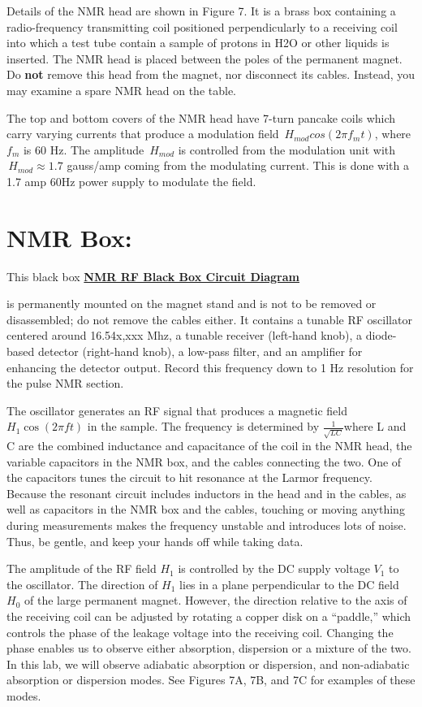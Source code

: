 \documentclass{../lab}
\begin{document}
Details of the NMR head are shown in Figure 7. It is a brass box containing a radio-frequency transmitting coil positioned perpendicularly to a receiving coil into which a test tube contain a sample of protons in H2O or other liquids is inserted. The NMR head is placed between the poles of the permanent magnet. Do \textbf{not} remove this head from the magnet, nor disconnect its cables. Instead, you may examine a spare NMR head on the table.

The top and bottom covers of the NMR head have 7-turn pancake coils which carry varying currents that produce a modulation field ${ \!\,H_{mod} cos \left (2 \pi f_m t \right) }$, where $ {f_m }$ is 60 Hz. The amplitude $ {\!\,H_{mod} }$ is controlled from the modulation unit with $ {\!\, H_{mod} \approx 1.7 }$ gauss/amp coming from the modulating current. This is done with a 1.7 amp 60Hz power supply to modulate the field.

\section{NMR Box:}

This black box \href{http://experimentationlab.berkeley.edu/sites/default/files/images/NMR31.gif}{\textbf{NMR RF Black Box Circuit Diagram}}

is permanently mounted on the magnet stand and is not to be removed or disassembled; do not remove the cables either. It contains a tunable RF oscillator centered around 16.54x,xxx Mhz, a tunable receiver (left-hand knob), a diode-based detector (right-hand knob), a low-pass filter, and an amplifier for enhancing the detector output. Record this frequency down to 1 Hz resolution for the pulse NMR section.

The oscillator generates an RF signal that produces a magnetic field  $ {H_1 \cos \left (2 \pi f t \right) }$ in the sample. The frequency is determined by ${ \frac {1} {\sqrt{LC}} }$where L and C are the combined inductance and capacitance of the coil in the NMR head, the variable capacitors in the NMR box, and the cables connecting the two. One of the capacitors tunes the circuit to hit resonance at the Larmor frequency. Because the resonant circuit includes inductors in the head and in the cables, as well as capacitors in the NMR box and the cables, touching or moving anything during measurements makes the frequency unstable and introduces lots of noise. Thus, be gentle, and keep your hands off while taking data.

The amplitude of the RF field $H_1$ is controlled by the DC supply voltage $V_1$ to the oscillator. The direction of $H_1$ lies in a plane perpendicular to the DC field $H_0$ of the large permanent magnet. However, the direction relative to the axis of the receiving coil can be adjusted by rotating a copper disk on a ``paddle,'' which controls the phase of the leakage voltage into the receiving coil. Changing the phase enables us to observe either absorption, dispersion or a mixture of the two. In this lab, we will observe adiabatic absorption or dispersion, and non-adiabatic absorption or dispersion modes. See Figures 7A, 7B, and 7C for examples of these modes.
\end{document}
